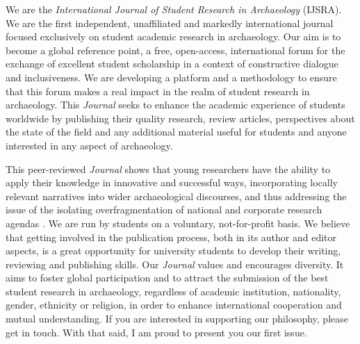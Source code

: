 We are the \textit{International Journal of Student Research in Archaeology} (IJSRA). We are the first independent, unaffiliated and markedly international journal focused exclusively on student academic research in archaeology. Our aim is to become a global reference point, a free, open-access, international forum for the exchange of excellent student scholarship in a context of constructive dialogue and inclusiveness. We are developing a platform and a methodology to ensure that this forum makes a real impact in the realm of student research in archaeology. This \textit{Journal} seeks to enhance the academic experience of students worldwide by publishing their quality research, review articles, perspectives about the state of the field and any additional material useful for students and anyone interested in any aspect of archaeology.

This peer-reviewed \textit{Journal} shows that young researchers have the ability to apply their knowledge in innovative and successful ways, incorporating locally relevant narratives into wider archaeological discourses, and thus addressing the issue of the isolating over\-fragmentation of national and corporate research agendas \parencite{Mizoguchi_2015}. 
We are run by students on a voluntary, not-for-profit basis. We believe that getting involved in the publication process, both in its author and editor aspects, is a great opportunity for university students to develop their writing, reviewing and publishing skills. 
Our \textit{Journal} values and encourages diversity. 
It aims to foster global participation and to attract the submission of the best student research in archaeology, regardless of academic institution, nationality, gender, ethnicity or religion, in order to enhance international cooperation and mutual understanding. If you are interested in supporting our philosophy, please get in touch. With that said, I am proud to present you our first issue. 

\printbibliography[heading=subbibnumbered] 

\label{editorial:lastpage}
\closingarticle